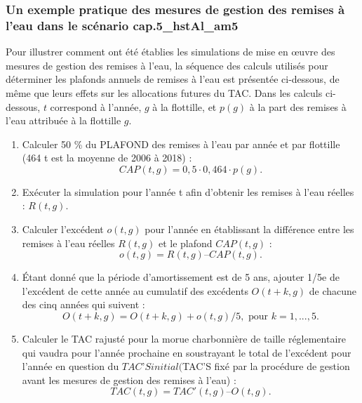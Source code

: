 \documentclass[11pt]{book}
\begin{document}
\hypertarget{un-exemple-pratique-des-mesures-de-gestion-des-remises-uxe0-leau-dans-le-scuxe9nario-cap.5_hstal_am5}{%
\subsubsection{\texorpdfstring{Un exemple pratique des mesures de gestion des remises à l'eau dans le scénario \textbf{cap.5\_hstAl\_am5}}{Un exemple pratique des mesures de gestion des remises à l'eau dans le scénario cap.5\_hstAl\_am5}}\label{un-exemple-pratique-des-mesures-de-gestion-des-remises-uxe0-leau-dans-le-scuxe9nario-cap.5_hstal_am5}}

Pour illustrer comment ont été établies les simulations de mise en œuvre des mesures de gestion des remises à l'eau, la séquence des calculs utilisés pour déterminer les plafonds annuels de remises à l'eau est présentée ci-dessous, de même que leurs effets sur les allocations futures du TAC. Dans les calculs ci-dessous, \(t\) correspond à l'année, \(g\) à la flottille, et \(p(g)\) à la part des remises à l'eau attribuée à la flottille \(g\).
\begin{enumerate}
\def\labelenumi{\arabic{enumi}.}

\item
  Calculer 50 \% du PLAFOND des remises à l'eau par année et par flottille (464 t est la moyenne de 2006 à 2018) : \begin{equation*} 
  CAP(t,g) = 0,5 \cdot 0,464 \cdot p(g). 
  \end{equation*}
\item
  Exécuter la simulation pour l'année t afin d'obtenir les remises à l'eau réelles : \(R(t,g)\).
\item
  Calculer l'excédent \(o(t,g)\) pour l'année en établissant la différence entre les remises à l'eau réelles \(R(t,g)\) et le plafond \(CAP(t,g)\) : \tabularnewline \begin{equation*} 
  o(t,g) = R(t,g) – CAP(t,g).
  \end{equation*}
\item
  Étant donné que la période d'amortissement est de 5 ans, ajouter 1/5e de l'excédent de cette année au cumulatif des excédents \(O(t+k,g)\) de chacune des cinq années qui suivent : \begin{equation*}
  O(t + k,g) = O(t+k,g) + o(t,g)/5, \mbox{ pour } k = 1, ..., 5.    
  \end{equation*}
\item
  Calculer le TAC rajusté pour la morue charbonnière de taille réglementaire qui vaudra pour l'année prochaine en soustrayant le total de l'excédent pour l'année en question du \(TAC’S initial (\)TAC'S fixé par la procédure de gestion avant les mesures de gestion des remises à l'eau) : \begin{equation*}
  TAC(t,g) = TAC'(t,g) – O(t,g).
  \end{equation*}
\end{enumerate}
\end{document}
